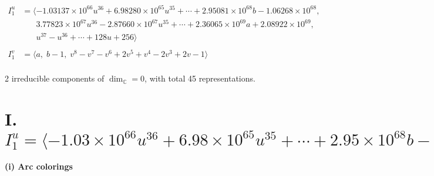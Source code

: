 \documentclass[1p]{elsarticle_modified}
\theoremstyle{definition}
\begin{document}
\begin{align*}
I^u_{1}&=\langle 
-1.03137\times10^{66} u^{36}+6.98280\times10^{65} u^{35}+\cdots+2.95081\times10^{68} b-1.06268\times10^{68},\\
\phantom{I^u_{1}}&\phantom{= \langle  }3.77823\times10^{67} u^{36}-2.87660\times10^{67} u^{35}+\cdots+2.36065\times10^{69} a+2.08922\times10^{69},\\
\phantom{I^u_{1}}&\phantom{= \langle  }u^{37}- u^{36}+\cdots+128 u+256\rangle \\
\\
I^v_{1}&=\langle 
a,\;b-1,\;v^8- v^7- v^6+2 v^5+v^4-2 v^3+2 v-1\rangle \\
\end{align*}
\raggedright * 2 irreducible components of $\dim_{\mathbb{C}}=0$, with total 45 representations.\\
\newpage
\renewcommand{\arraystretch}{1}
\centering \section*{I. $I^u_{1}= \langle -1.03\times10^{66} u^{36}+6.98\times10^{65} u^{35}+\cdots+2.95\times10^{68} b-1.06\times10^{68},\;3.78\times10^{67} u^{36}-2.88\times10^{67} u^{35}+\cdots+2.36\times10^{69} a+2.09\times10^{69},\;u^{37}- u^{36}+\cdots+128 u+256 \rangle$}
\flushleft \textbf{(i) Arc colorings}\\
\end{document}
